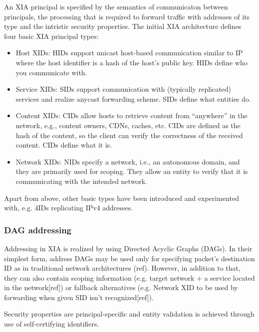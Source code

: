             An XIA principal is specified by the semantics of communicaton between principals, the processing that is required to forward traffic with addresses of its type and the intristic security properties. The initial XIA architecture defines four basic XIA principal types:

            \begin{itemize}
                \item Host XIDs: HIDs support unicast host-based communication similar to IP where the host identifier is a hash of the host’s public key. HIDs define who you communicate with.
                \item Service XIDs: SIDs support communication with (typically replicated) services and realize anycast forwarding scheme. SIDs define what entities do.
                \item Content XIDs: CIDs allow hosts to retrieve content from ``anywhere'' in the network, e.g., content owners, CDNs, caches, etc. CIDs are defined as the hash of the content, so the client can verify the correctness of the received content. CIDs define what it is.
                \item Network XIDs: NIDs specify a network, i.e., an autonomous domain, and they are primarily used for scoping. They allow an entity to verify that it is communicating with the intended network.
            \end{itemize}

            Apart from above, other basic types have been introduced and experimented with, e.g. 4IDs replicating IPv4 addresses.


            \subsubsection{DAG addressing}

            Addressing in XIA is realized by using Directed Acyclic Graphs (DAGs). In their simplest form, address DAGs may be used only for specifying packet's destination ID as in traditional network architectures (ref). However, in addition to that, they can also contain scoping information (e.g. target network + a service located in the network[ref]) or fallback alternatives (e.g. Network XID to be used by forwarding when given SID isn't recognized[ref]).

            Security properties are principal-specific and entity validation is achieved through use of self-certifying identifiers.

